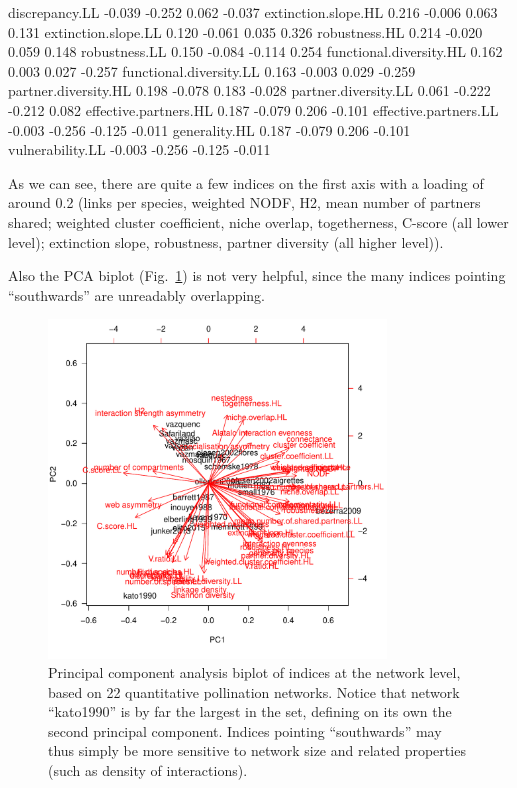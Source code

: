 \documentclass[a4paper, 11pt]{article}\usepackage[]{graphicx}\usepackage[]{color}
\begin{document}
\begin{Schunk}
\begin{Soutput}
discrepancy.LL                       -0.039 -0.252  0.062 -0.037
extinction.slope.HL                   0.216 -0.006  0.063  0.131
extinction.slope.LL                   0.120 -0.061  0.035  0.326
robustness.HL                         0.214 -0.020  0.059  0.148
robustness.LL                         0.150 -0.084 -0.114  0.254
functional.diversity.HL               0.162  0.003  0.027 -0.257
functional.diversity.LL               0.163 -0.003  0.029 -0.259
partner.diversity.HL                  0.198 -0.078  0.183 -0.028
partner.diversity.LL                  0.061 -0.222 -0.212  0.082
effective.partners.HL                 0.187 -0.079  0.206 -0.101
effective.partners.LL                -0.003 -0.256 -0.125 -0.011
generality.HL                         0.187 -0.079  0.206 -0.101
vulnerability.LL                     -0.003 -0.256 -0.125 -0.011
\end{Soutput}
\end{Schunk}
As we can see, there are quite a few indices on the first axis with a loading of around 0.2 (links per species, weighted NODF, H2, mean number of partners shared; weighted cluster coefficient, niche overlap, togetherness, C-score (all lower level); extinction slope, robustness, partner diversity (all higher level)). 

Also the PCA biplot (Fig.~\ref{fig:PCAnetworklevel}) is not very helpful, since the many indices pointing ``southwards'' are unreadably overlapping.
%
\begin{figure}
\centering
\includegraphics[width=0.8\textwidth]{figures/PCAnetworklevel}
\caption{Principal component analysis biplot of indices at the network level, based on 22 quantitative pollination networks. Notice that network ``kato1990'' is by far the largest in the set, defining on its own the second principal component. Indices pointing ``southwards'' may thus simply be more sensitive to network size and related properties (such as density of interactions).}
\label{fig:PCAnetworklevel}
\end{figure}
\end{document}
